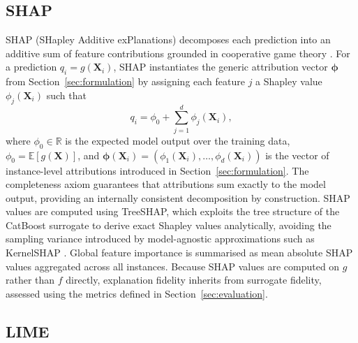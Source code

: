 \documentclass[oneside]{memoir} %
\begin{document}
\subsection{SHAP}

SHAP (SHapley Additive exPlanations) decomposes each prediction into an additive sum of feature contributions grounded in cooperative game theory \parencite{lundberg_unified_2017}. For a prediction $q_i = g(\mathbf{X}_i)$, SHAP instantiates the generic attribution vector $\boldsymbol{\phi}$ from Section~\ref{sec:formulation} by assigning each feature $j$ a Shapley value $\phi_j(\mathbf{X}_i)$ such that
\[
q_i = \phi_0 + \sum_{j=1}^{d} \phi_j(\mathbf{X}_i),
\]
where $\phi_0 \in \mathbb{R}$ is the expected model output over the training data, $\phi_0 = \mathbb{E}[g(\mathbf{X})]$, and $\boldsymbol{\phi}(\mathbf{X}_i) = (\phi_1(\mathbf{X}_i), \ldots, \phi_d(\mathbf{X}_i))$ is the vector of instance-level attributions introduced in Section~\ref{sec:formulation}. The completeness axiom guarantees that attributions sum exactly to the model output, providing an internally consistent decomposition by construction. SHAP values are computed using TreeSHAP, which exploits the tree structure of the CatBoost surrogate to derive exact Shapley values analytically, avoiding the sampling variance introduced by model-agnostic approximations such as KernelSHAP \parencite{lundberg_unified_2017}. Global feature importance is summarised as mean absolute SHAP values aggregated across all instances. Because SHAP values are computed on $g$ rather than $f$ directly, explanation fidelity inherits from surrogate fidelity, assessed using the metrics defined in Section~\ref{sec:evaluation}.

\subsection{LIME}
\end{document}
